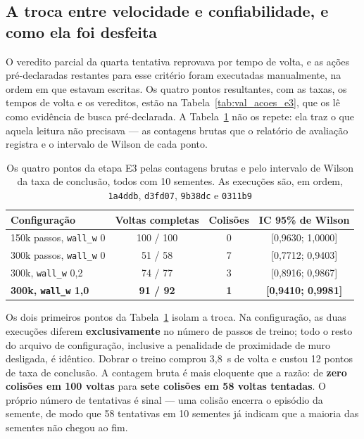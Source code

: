 \subsection{A troca entre velocidade e confiabilidade, e como ela foi desfeita}

O veredito parcial da quarta tentativa reprovava por tempo de volta, e as ações
pré-declaradas restantes para esse critério foram executadas manualmente, na
ordem em que estavam escritas. Os quatro pontos resultantes, com as taxas, os
tempos de volta e os vereditos, estão na Tabela~\ref{tab:val_acoes_e3}, que os
lê como evidência de busca pré-declarada. A Tabela~\ref{tab:res_e3_pontos} não
os repete: ela traz o que aquela leitura não precisava --- as contagens brutas
que o relatório de avaliação registra e o intervalo de Wilson de cada ponto.

\begin{table}[h]
    \centering
    \small
    \begin{tabular}{|l|c|c|c|}
        \hline
        \textbf{Configuração} & \textbf{Voltas completas} & \textbf{Colisões} &
        \textbf{IC 95\% de Wilson} \\
        \hline
        150k passos, \texttt{wall\_w} 0 & 100 / 100 & 0 & [0,9630; 1,0000] \\
        \hline
        300k passos, \texttt{wall\_w} 0 & 51 / 58 & 7 & [0,7712; 0,9403] \\
        \hline
        300k, \texttt{wall\_w} 0,2 & 74 / 77 & 3 & [0,8916; 0,9867] \\
        \hline
        \textbf{300k, \texttt{wall\_w} 1,0} & \textbf{91 / 92} & \textbf{1} &
        \textbf{[0,9410; 0,9981]} \\
        \hline
    \end{tabular}
    \caption{Os quatro pontos da etapa E3 pelas contagens brutas e pelo
    intervalo de Wilson da taxa de conclusão, todos com 10 sementes. As
    execuções são, em ordem, \texttt{1a4ddb}, \texttt{d3fd07}, \texttt{9b38dc}
    e \texttt{0311b9}}
    \label{tab:res_e3_pontos}
\end{table}

Os dois primeiros pontos da Tabela~\ref{tab:res_e3_pontos} isolam a troca. Na
configuração, as duas execuções diferem \textbf{exclusivamente} no número de
passos de treino; todo o resto do arquivo de configuração, inclusive a
penalidade de proximidade de muro desligada, é idêntico. Dobrar o treino comprou 3,8~s de volta e custou 12 pontos de taxa de
conclusão. A contagem bruta é mais eloquente que a razão: de \textbf{zero
colisões em 100 voltas} para \textbf{sete colisões em 58 voltas tentadas}. O
próprio número de tentativas é sinal --- uma colisão encerra o episódio da
semente, de modo que 58 tentativas em 10 sementes já indicam que a maioria das
sementes não chegou ao fim.

